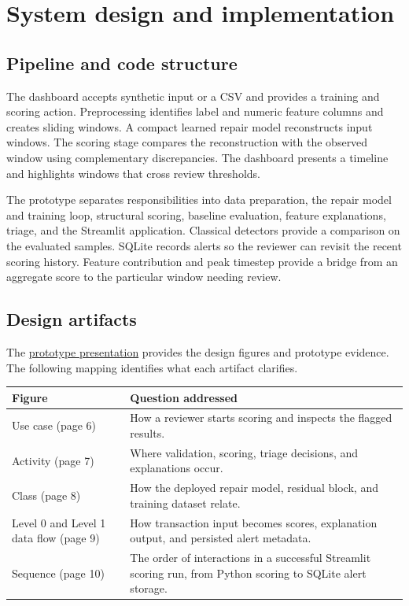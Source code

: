 \documentclass[11pt,a4paper]{article}
\begin{document}
\section{System design and implementation}
\subsection{Pipeline and code structure}
The dashboard accepts synthetic input or a CSV and provides a training and scoring action. Preprocessing identifies label and numeric feature columns and creates sliding windows. A compact learned repair model reconstructs input windows. The scoring stage compares the reconstruction with the observed window using complementary discrepancies. The dashboard presents a timeline and highlights windows that cross review thresholds.

The prototype separates responsibilities into data preparation, the repair model and training loop, structural scoring, baseline evaluation, feature explanations, triage, and the Streamlit application. Classical detectors provide a comparison on the evaluated samples. SQLite records alerts so the reviewer can revisit the recent scoring history. Feature contribution and peak timestep provide a bridge from an aggregate score to the particular window needing review.

\subsection{Design artifacts}
The \href{https://github.com/aakritisharma001/ucs503p-202627-ReVive/blob/master/project-report-prototype-stage/ReVive-prototype.pdf}{prototype presentation} provides the design figures and prototype evidence. The following mapping identifies what each artifact clarifies.

\noindent\begin{tabularx}{\linewidth}{@{}lX@{}}
\toprule
Figure & Question addressed\\
\midrule
Use case (page 6) & How a reviewer starts scoring and inspects the flagged results.\\
Activity (page 7) & Where validation, scoring, triage decisions, and explanations occur.\\
Class (page 8) & How the deployed repair model, residual block, and training dataset relate.\\
Level 0 and Level 1 data flow (page 9) & How transaction input becomes scores, explanation output, and persisted alert metadata.\\
Sequence (page 10) & The order of interactions in a successful Streamlit scoring run, from Python scoring to SQLite alert storage.\\
\bottomrule
\end{tabularx}
\end{document}
